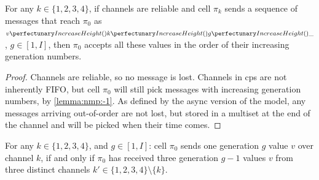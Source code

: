 \begin{lemma}\label{lemma:nmp:-2}
    For any $k \in \{ 1, 2, 3, 4 \}$, if channels are reliable and cell $\pi_k$ sends a sequence of messages that reach $\pi_0$ as $\cpvv{k}{g}{\cpdiscard}$, $g \in [1,I]$, 
    then $\pi_0$ accepts all these values in the order of their increasing generation numbers.
\end{lemma}

\begin{proof}
    Channels are reliable, so no message is lost. Channels in \gls{cps} are not inherently FIFO, but cell $\pi_0$ will still pick messages with increasing generation numbers, by \cref{lemma:nmp:-1}.
    As defined by the async version of the model, any messages arriving out-of-order are not lost, but stored in a multiset at the end of the channel
    and will be picked when their time comes.
\end{proof}

\begin{lemma}\label{lemma:nmp:-3}
    For any $k \in \{ 1, 2, 3, 4 \}$, and $g \in [1, I]$: cell $\pi_0$ sends one generation $g$ value $v$ over channel $k$, if and only if $\pi_0$ has received three generation $g-1$ values $v$ from three distinct channels $k' \in 
    \{ 1, 2, 3, 4 \} \setminus \{ k \}$.
\end{lemma}

